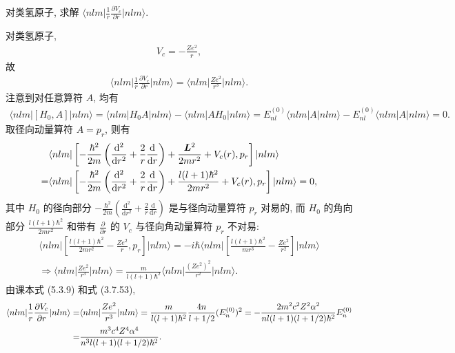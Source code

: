 \documentclass{assignment}
\begin{document}
\begin{prob}[补充习题]
    对类氢原子, 求解 $\langle nlm\rvert\frac{1}{r}\frac{\partial V_c}{\partial r}\lvert nlm\rangle$.
\end{prob}
\begin{sol}
    对类氢原子,
    \begin{align}
        V_c=-\frac{Ze^2}{r},
    \end{align}
    故
    \begin{align}
        \langle nlm\rvert\frac{1}{r}\frac{\partial V_c}{\partial r}\lvert nlm\rangle=\langle nlm\rvert\frac{Ze^2}{r^3}\lvert nlm\rangle.
    \end{align}
    注意到对任意算符 $A$, 均有
    \begin{align}
        \langle nlm\rvert[H_0,A]\lvert nlm\rangle=\langle nlm\rvert H_0A\lvert nlm\rangle-\langle nlm\rvert AH_0\rvert nlm\rangle=E_{nl}^{(0)}\langle nlm\rvert A\lvert nlm\rangle-E_{nl}^{(0)}\langle nlm\rvert A\lvert nlm\rangle=0.
    \end{align}
    取径向动量算符 $A=p_r$, 则有
    \begin{align}
        \notag&\langle nlm\rvert\left[-\frac{\hbar^2}{2m}\left(\frac{\mathrm{d}^2}{\mathrm{d}r^2}+\frac{2}{r}\frac{\mathrm{d}}{\mathrm{d}r}\right)+\frac{\bm{L}^2}{2mr^2}+V_c(r),p_r\right]\lvert nlm\rangle\\
        =&\langle nlm\rvert\left[-\frac{\hbar^2}{2m}\left(\frac{\mathrm{d}^2}{\mathrm{d}r^2}+\frac{2}{r}\frac{\mathrm{d}}{\mathrm{d}r}\right)+\frac{l(l+1)\hbar^2}{2mr^2}+V_c(r),p_r\right]\lvert nlm\rangle=0,
    \end{align}
    其中 $H_0$ 的径向部分 $-\frac{\hbar^2}{2m}\left(\frac{\mathrm{d}^2}{\mathrm{d}r^2}+\frac{2}{r}\frac{\mathrm{d}}{\mathrm{d}r}\right)$ 是与径向动量算符 $p_r$ 对易的, 而 $H_0$ 的角向部分 $\frac{l(l+1)\hbar^2}{2mr^2}$ 和带有 $\frac{\partial}{\partial r}$ 的 $V_c$ 与径向角动量算符 $p_r$ 不对易:
    \begin{gather}
        \langle nlm\rvert\left[\frac{l(l+1)\hbar^2}{2mr^2}-\frac{Ze^2}{r},p_r\right]\lvert nlm\rangle=-i\hbar\langle nlm\rvert\left[\frac{l(l+1)\hbar^2}{mr^3}-\frac{Ze^2}{r^2}\right]\lvert nlm\rangle\\
        \Longrightarrow\langle nlm\rvert\frac{Ze^2}{r^3}\lvert nlm\rangle=\frac{m}{l(l+1)\hbar^2}\langle nlm\rvert\frac{(Ze^2)^2}{r^2}\lvert nlm\rangle.
    \end{gather}
    由课本式 (5.3.9) 和式 (3.7.53),
    \begin{align}
        \notag\langle nlm\rvert\frac{1}{r}\frac{\partial V_c}{\partial r}\lvert nlm\rangle=&\langle nlm\rvert\frac{Ze^2}{r^3}\lvert nlm\rangle=\frac{m}{l(l+1)\hbar^2}\frac{4n}{l+1/2}(E_n^{(0)})^2=-\frac{2m^2c^2Z^2\alpha^2}{nl(l+1)(l+1/2)\hbar^2}E_n^{(0)}\\
        =&\frac{m^3c^4Z^4\alpha^4}{n^3l(l+1)(l+1/2)\hbar^2}.
    \end{align}
\end{sol}
\end{document}
